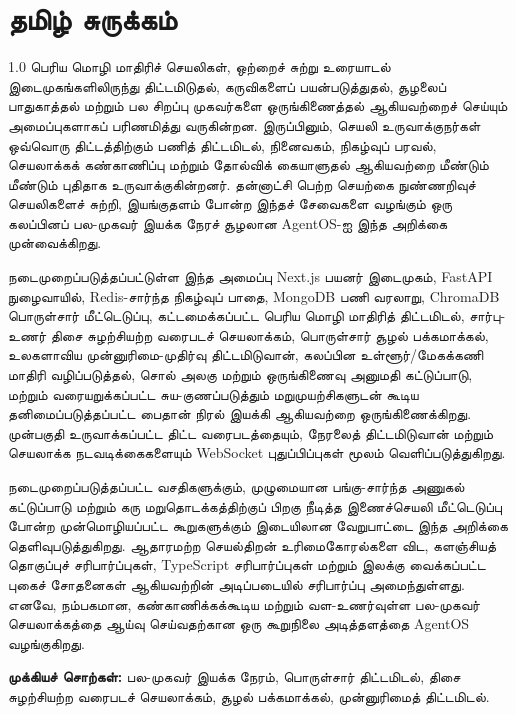 \chapter*{{\tamilfont தமிழ் சுருக்கம்}}

{\tamilfont
\begin{spacing}{1.0}
\fontsize{11pt}{13pt}\selectfont
பெரிய மொழி மாதிரிச் செயலிகள், ஒற்றைச் சுற்று உரையாடல் இடைமுகங்களிலிருந்து திட்டமிடுதல், கருவிகளைப் பயன்படுத்துதல், சூழலைப் பாதுகாத்தல் மற்றும் பல சிறப்பு முகவர்களை ஒருங்கிணைத்தல் ஆகியவற்றைச் செய்யும் அமைப்புகளாகப் பரிணமித்து வருகின்றன. இருப்பினும், செயலி உருவாக்குநர்கள் ஒவ்வொரு திட்டத்திற்கும் பணித் திட்டமிடல், நினைவகம், நிகழ்வுப் பரவல், செயலாக்கக் கண்காணிப்பு மற்றும் தோல்விக் கையாளுதல் ஆகியவற்றை மீண்டும் மீண்டும் புதிதாக உருவாக்குகின்றனர். தன்னாட்சி பெற்ற செயற்கை நுண்ணறிவுச் செயலிகளைச் சுற்றி, இயங்குதளம் போன்ற இந்தச் சேவைகளை வழங்கும் ஒரு கலப்பினப் பல-முகவர் இயக்க நேரச் சூழலான AgentOS-ஐ இந்த அறிக்கை முன்வைக்கிறது.

நடைமுறைப்படுத்தப்பட்டுள்ள இந்த அமைப்பு Next.js பயனர் இடைமுகம், FastAPI நுழைவாயில், Redis-சார்ந்த நிகழ்வுப் பாதை, MongoDB பணி வரலாறு, ChromaDB பொருள்சார் மீட்டெடுப்பு, கட்டமைக்கப்பட்ட பெரிய மொழி மாதிரித் திட்டமிடல், சார்பு-உணர் திசை சுழற்சியற்ற வரைபடச் செயலாக்கம், பொருள்சார் சூழல் பக்கமாக்கல், உலகளாவிய முன்னுரிமை-முதிர்வு திட்டமிடுவான், கலப்பின உள்ளூர்/மேகக்கணி மாதிரி வழிப்படுத்தல், சொல் அலகு மற்றும் ஒருங்கிணைவு அனுமதி கட்டுப்பாடு, மற்றும் வரையறுக்கப்பட்ட சுய-குணப்படுத்தும் மறுமுயற்சிகளுடன் கூடிய தனிமைப்படுத்தப்பட்ட பைதான் நிரல் இயக்கி ஆகியவற்றை ஒருங்கிணைக்கிறது. முன்பகுதி உருவாக்கப்பட்ட திட்ட வரைபடத்தையும், நேரலைத் திட்டமிடுவான் மற்றும் செயலாக்க நடவடிக்கைகளையும் WebSocket புதுப்பிப்புகள் மூலம் வெளிப்படுத்துகிறது.

நடைமுறைப்படுத்தப்பட்ட வசதிகளுக்கும், முழுமையான பங்கு-சார்ந்த அணுகல் கட்டுப்பாடு மற்றும் கரு மறுதொடக்கத்திற்குப் பிறகு நீடித்த இணைச்செயலி மீட்டெடுப்பு போன்ற முன்மொழியப்பட்ட கூறுகளுக்கும் இடையிலான வேறுபாட்டை இந்த அறிக்கை தெளிவுபடுத்துகிறது. ஆதாரமற்ற செயல்திறன் உரிமைகோரல்களை விட, களஞ்சியத் தொகுப்புச் சரிபார்ப்புகள், TypeScript சரிபார்ப்புகள் மற்றும் இலக்கு வைக்கப்பட்ட புகைச் சோதனைகள் ஆகியவற்றின் அடிப்படையில் சரிபார்ப்பு அமைந்துள்ளது. எனவே, நம்பகமான, கண்காணிக்கக்கூடிய மற்றும் வள-உணர்வுள்ள பல-முகவர் செயலாக்கத்தை ஆய்வு செய்வதற்கான ஒரு கூறுநிலை அடித்தளத்தை AgentOS வழங்குகிறது.

\enlargethispage{4\baselineskip}
\textbf{முக்கியச் சொற்கள்:} பல-முகவர் இயக்க நேரம், பொருள்சார் திட்டமிடல், திசை சுழற்சியற்ற வரைபடச் செயலாக்கம், சூழல் பக்கமாக்கல், முன்னுரிமைத் திட்டமிடல்.
\end{spacing}
}
